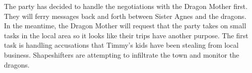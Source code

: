 The party has decided to handle the negotiations with the Dragon Mother first.
They will ferry messages back and forth between Sister Agnes and the dragons.
In the meantime, the Dragon Mother will request that the party takes on small tasks in the local area so it looks like their trips have another purpose.
The first task is handling accusations that Timmy's kids have been stealing from local business.
Shapeshifters are attempting to infiltrate the town and monitor the dragons.
